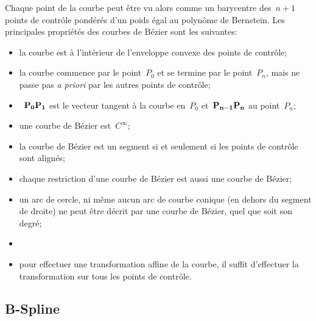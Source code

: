 Chaque point de la courbe peut être vu alors comme un barycentre des~$n+1$ points de contrôle pondérés d'un poids égal au polynôme de Bernstein. 
Les principales propriétés des courbes de Bézier sont les suivantes:
\begin{itemize}
\item la courbe est à l'intérieur de l'enveloppe convexe des points de contrôle; 
\item la courbe commence par le point~$P_0$ et se termine par le point~$P_n$, mais ne passe pas \emph{a priori} par les autres points de contrôle;
\item~$\mathbf{P_0P_1}$ est le vecteur tangent à la courbe en~$P_0$ et~$\mathbf{P_{n-1}P_n}$ au point~$P_n$;
\item une courbe de Bézier est~$C^{\infty}$;
\item la courbe de Bézier est un segment si et seulement si les points de contrôle sont alignés;
\item chaque restriction d'une courbe de Bézier est aussi une courbe de Bézier;
\item un arc de cercle, ni même aucun arc de courbe conique (en dehors du segment de droite) ne peut être décrit par une courbe de Bézier, quel que soit son degré;
\item {}
\item pour effectuer une transformation affine de la courbe, il suffit d'effectuer la transformation sur tous les points de contrôle. 
\end{itemize}

\medskip
\subsection{B-Spline}

